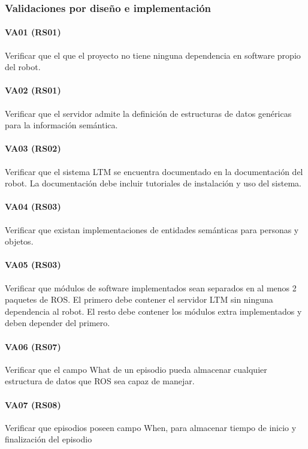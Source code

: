 \subsubsection{Validaciones por diseño e implementación}
\paragraph{VA01 (RS01)}
Verificar que el que el proyecto no tiene ninguna dependencia en software propio del robot.

\paragraph{VA02 (RS01)}
Verificar que el servidor admite la definición de estructuras de datos genéricas para la información semántica.

\paragraph{VA03 (RS02)}
Verificar que el sistema LTM se encuentra documentado en la documentación del robot. La documentación debe incluir tutoriales de instalación y uso del sistema.

\paragraph{VA04 (RS03)}
Verificar que existan implementaciones de entidades semánticas para personas y objetos.

\paragraph{VA05 (RS03)}
Verificar que módulos de software implementados sean separados en al menos 2 paquetes de ROS. El primero debe contener el servidor LTM sin ninguna dependencia al robot. El resto debe contener los módulos extra implementados y deben depender del primero.

\paragraph{VA06 (RS07)}
Verificar que el campo What de un episodio pueda almacenar cualquier estructura de datos que ROS sea capaz de manejar.

\paragraph{VA07 (RS08)}
Verificar que episodios poseen campo When, para almacenar tiempo de inicio y finalización del episodio

